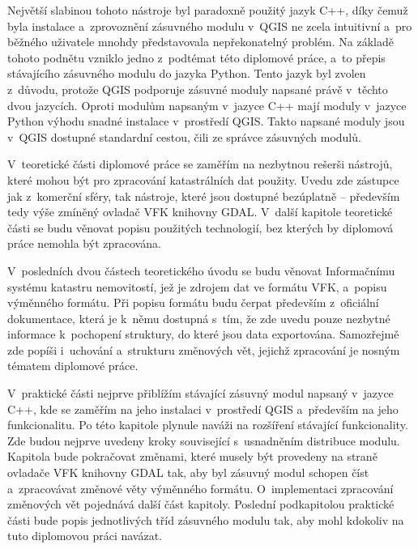 \documentclass[a4paper,12pt,oneside]{book}
\begin{document}
Největší slabinou tohoto nástroje byl paradoxně použitý jazyk C++,
díky čemuž byla instalace a~zprovoznění zásuvného modulu v~QGIS ne
zcela intuitivní a~pro běžného uživatele mnohdy představovala
nepřekonatelný problém. Na základě tohoto podnětu vzniklo jedno
z~podtémat této diplomové práce, a~to přepis stávajícího zásuvného
modulu do jazyka Python. Tento jazyk byl zvolen z~důvodu, protože QGIS
podporuje zásuvné moduly napsané právě v~těchto dvou jazycích. Oproti
modulům napsaným v~jazyce C++ mají moduly v~jazyce Python výhodu
snadné instalace v~prostředí QGIS. Takto napsané moduly jsou v~QGIS
dostupné standardní cestou, čili ze správce zásuvných modulů.

V~teoretické části diplomové práce se zaměřím na nezbytnou rešerši
nástrojů, které mohou být pro zpracování katastrálních dat
použity. Uvedu zde zástupce jak z~komerční sféry, tak nástroje, které
jsou dostupné bezúplatně -- především tedy výše zmíněný ovladač VFK
knihovny GDAL. V~další kapitole teoretické části se budu věnovat
popisu použitých technologií, bez kterých by diplomová práce nemohla
být zpracována.

V~posledních dvou částech teoretického úvodu se budu věnovat
Informačnímu systému katastru nemovitostí, jež je zdrojem dat ve
formátu VFK, a~popisu výměnného formátu. Při popisu formátu budu
čerpat především z~oficiální dokumentace, která je k~němu dostupná
s~tím, že zde uvedu pouze nezbytné informace k~pochopení struktury, do
které jsou data exportována. Samozřejmě zde popíši i~uchování
a~strukturu změnových vět, jejichž zpracování je nosným tématem
diplomové práce.

V~praktické části nejprve přiblížím stávající zásuvný modul napsaný
v~jazyce C++, kde se zaměřím na jeho instalaci v~prostředí QGIS
a~především na jeho funkcionalitu. Po této kapitole plynule naváži na
rozšíření stávající funkcionality. Zde budou nejprve uvedeny kroky
související s~usnadněním distribuce modulu. Kapitola bude pokračovat
změnami, které musely být provedeny na straně ovladače VFK knihovny
GDAL tak, aby byl zásuvný modul schopen číst a~zpracovávat změnové
věty výměnného formátu. O~implementaci zpracování změnových vět
pojednává dal\-ší část kapitoly. Poslední podkapitolou praktické části
bude popis jednotlivých tříd zásuvného modulu tak, aby mohl kdokoliv
na tuto diplomovou práci navázat.
\end{document}
